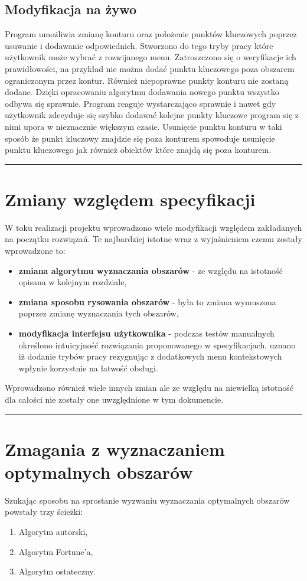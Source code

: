 \documentclass[a4paper,11pt]{article}
\newcommand{\linia}{\rule{\linewidth}{0.4mm}}
\begin{document}
\subsection{Modyfikacja na żywo}
Program umożliwia zmianę konturu oraz położenie punktów kluczowych poprzez usuwanie i dodawanie odpowiednich. Stworzono do tego tryby pracy które użytkownik może wybrać z rozwijanego menu. Zatroszczono się o weryfikacje ich prawidłowości, na przykład nie można dodać punktu kluczowego poza obszarem ograniczonym przez kontur. Również niepoprawne punkty konturu nie zostaną dodane. Dzięki opracowaniu algorytmu dodawania nowego punktu wszystko odbywa się sprawnie. Program reaguje wystarczająco sprawnie i nawet gdy użytkownik zdecyduje się szybko dodawać kolejne punkty kluczowe program się z nimi upora w nieznacznie większym czasie. Usunięcie punktu konturu w taki sposób że punkt kluczowy znajdzie się poza konturem spowoduje usunięcie punktu kluczowego jak również obiektów które znajdą się poza konturem.

\noindent\linia
\section{Zmiany względem specyfikacji}
W toku realizacji projektu wprowadzono wiele modyfikacji względem zakładanych na początku rozwiązań. Te najbardziej istotne wraz z wyjaśnieniem czemu zostały wprowadzone to:
\begin{itemize}
\item \textbf{zmiana algorytmu wyznaczania obszarów} - ze względu na istotność opisana w kolejnym rozdziale,
\item \textbf{zmiana sposobu rysowania obszarów} - była to zmiana wymuszona poprzez zmianę wyznaczania tych obszarów,
\item \textbf{modyfikacja interfejsu użytkownika} - podczas testów manualnych określono intuicyjność rozwiązania proponowanego w specyfikacjach, uznano iż dodanie trybów pracy rezygnując z dodatkowych menu kontekstowych wpłynie korzystnie na łatwość obsługi.
\end{itemize}
Wprowadzono również wiele innych zmian ale ze względu na niewielką istotność dla całości nie zostały one uwzględnione w tym dokumencie.

\noindent\linia
\section{Zmagania z wyznaczaniem optymalnych obszarów}
Szukając sposobu na sprostanie wyzwaniu wyznaczania optymalnych obszarów powstały trzy ścieżki:
\begin{enumerate}
\item Algorytm autorski,
\item Algorytm Fortune'a,
\item Algorytm ostateczny.
\end{enumerate}
\end{document}
